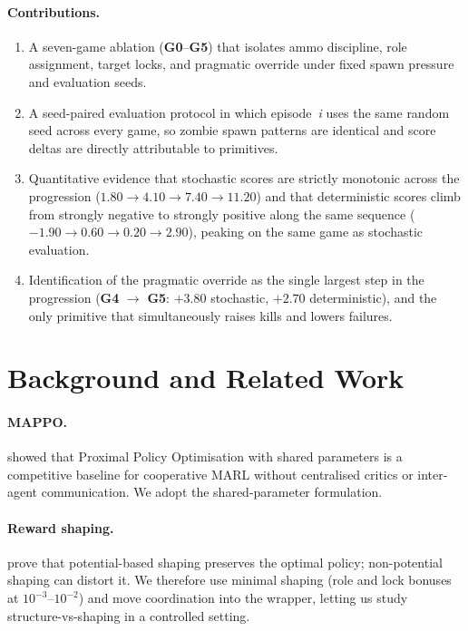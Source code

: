 \documentclass[11pt,a4paper]{article}
\newcommand{\gz}{\textbf{G0}}
\newcommand{\giv}{\textbf{G4}}
\newcommand{\gv}{\textbf{G5}}
\begin{document}
\paragraph{Contributions.}
\begin{enumerate}[nosep]
  \item A seven-game ablation (\gz{}--\gv{}) that isolates ammo
    discipline, role assignment, target locks, and pragmatic override
    under fixed spawn pressure and evaluation seeds.
  \item A seed-paired evaluation protocol in which episode~\emph{i} uses
    the same random seed across every game, so zombie spawn patterns are
    identical and score deltas are directly attributable to primitives.
  \item Quantitative evidence that stochastic scores are strictly
    monotonic across the progression
    ($1.80 \to 4.10 \to 7.40 \to 11.20$) and that deterministic scores
    climb from strongly negative to strongly positive along the same
    sequence ($-1.90 \to 0.60 \to 0.20 \to 2.90$), peaking on the same
    game as stochastic evaluation.
  \item Identification of the pragmatic override as the single largest
    step in the progression (\giv{} $\to$ \gv{}: $+3.80$ stochastic,
    $+2.70$ deterministic), and the only primitive that
    simultaneously raises kills and lowers failures.
\end{enumerate}

\section{Background and Related Work}
\label{sec:bg}

\paragraph{MAPPO.} \citet{yu2022surprising} showed that Proximal Policy
Optimisation \cite{schulman2017proximal} with shared parameters is a
competitive baseline for cooperative MARL without centralised critics or
inter-agent communication. We adopt the shared-parameter formulation.

\paragraph{Reward shaping.} \citet{ng1999policy} prove that
potential-based shaping preserves the optimal policy; non-potential
shaping can distort it. We therefore use minimal shaping
(role and lock bonuses at $10^{-3}$--$10^{-2}$) and move coordination
into the wrapper, letting us study structure-vs-shaping in a controlled
setting.
\end{document}
